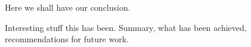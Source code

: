 \documentclass[../main.tex]{subfiles}
\begin{document}
Here we shall have our conclusion.

Interesting stuff this has been. Summary, what has been achieved, recommendations for future work.\\

\end{document}
